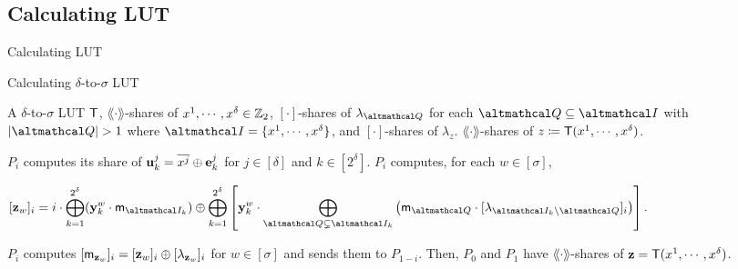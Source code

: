 \documentclass[../240906_cryptlab_flute.tex]{subfiles}
\begin{document}
\subsection{Calculating LUT}
\begin{frame}{Calculating LUT}
    \begin{block}{Calculating \(\delta\)-to-\(\sigma\) LUT}
        \begin{description}[Output]
            \ii[Input]
            A \(\delta\)-to-\(\sigma\) LUT \(\mathsf{T}\),
            \(\lang\cdot\rang\)-shares of \(x^1, \cdots, x^\delta \in \mathbb{Z}_2\),
            \([\cdot]\)-shares of \(\lambda_{\mcal{Q}}\) for each \(\mcal{Q} \subseteq \mcal{I}\)
            with \(|\mcal{Q}| > 1\) where \(\mcal{I} = \{x^1,\cdots,x^\delta\}\), and
            \([\cdot]\)-shares of \(\lambda_z\).
            \ii[Output]
            \(\lang\cdot\rang\)-shares of \(z \coloneqq \mathsf{T}(x^1, \cdots, x^\delta)\).
        \end{description}
        \pause
        \begin{enumerate}
            \ii
            \(P_i\) computes its share of \(\boldsymbol{\mathbf{u}}^j_k = \overline{x^j} \oplus \boldsymbol{\mathbf{e}}^j_k\)
            for \(j \in [\delta]\) and \(k \in [2^\delta]\).
            \pause
            \ii
            \(P_i\) computes, for each \(w \in [\sigma]\),
            \centerline{%
                \(\displaystyle
                [\vec{z}_w]_i = i \cdot \bigoplus_{k=1}^{2^\delta} (\vec{y}^w_k \cdot \msf{m}_{\mcal{I}_k})
                \oplus \bigoplus_{k=1}^{2^\delta} \left[
                    \vec{y}^w_k \cdot \bigoplus_{\mcal{Q} \subsetneq \mcal{I}_k} \big(
                    \msf{m}_{\mcal{Q}} \cdot [\lambda_{\mcal{I}_k \setminus \mcal{Q}}]_i \big)
                \right].
                \)
            }
            \pause
            \ii
            \(P_i\) computes \([\mathsf{m}_{\boldsymbol{\mathbf{z}}_w}]_i = [\boldsymbol{\mathbf{z}}_w]_i \oplus [\lambda_{\boldsymbol{\mathbf{z}}_w}]_i\)
            for \(w \in [\sigma]\) and sends them to \(P_{1-i}\).
            \ii
            Then, \(P_0\) and \(P_1\) have \(\lang\cdot\rang\)-shares of \(\boldsymbol{\mathbf{z}} = \mathsf{T}(x^1, \cdots, x^\delta)\).
        \end{enumerate}
    \end{block}
\end{frame}
\end{document}
